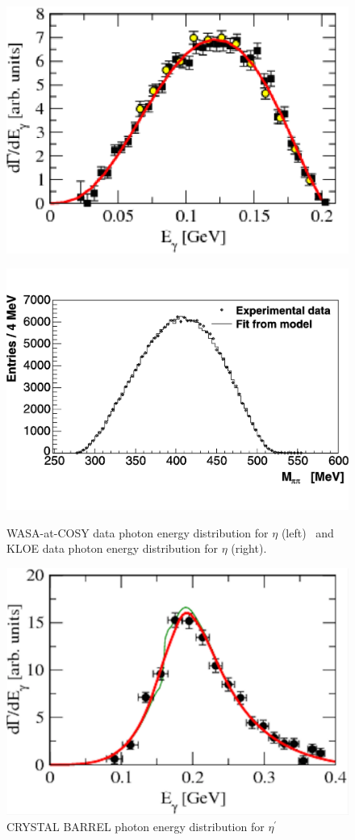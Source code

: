 \documentclass{aip-cp}
\begin{document}
\begin{figure}[h!]
	\centering
	\begin{minipage}{.30\textwidth}
		\centering
		\includegraphics[width=125 pt]{figures/WASA_eta.pdf}
		\caption{}{}
		\label{fig:wasa_eta}
	\end{minipage}%
	\centering
	\begin{minipage}{.30\textwidth}
		\centering
		\includegraphics[width=125 pt, height = 100 pt]{figures/KLOE_eta.pdf}
		\caption{WASA-at-COSY data photon energy distribution for $\eta$ (left)~\cite{bib3} and KLOE data photon energy distribution for $\eta$ (right)\cite{bib2}.}{}
		\label{fig:kloe_eta}
	\end{minipage}
\end{figure}
\begin{figure}[h!]
	\centerline{\includegraphics[width=135 pt]{figures/CRYSTAL_etaP.pdf}}
	\caption{CRYSTAL BARREL photon energy distribution for  $\eta^{\prime}$~\cite{bib3}}
	\label{fig:crystal_etaP}
\end{figure}
\end{document}
